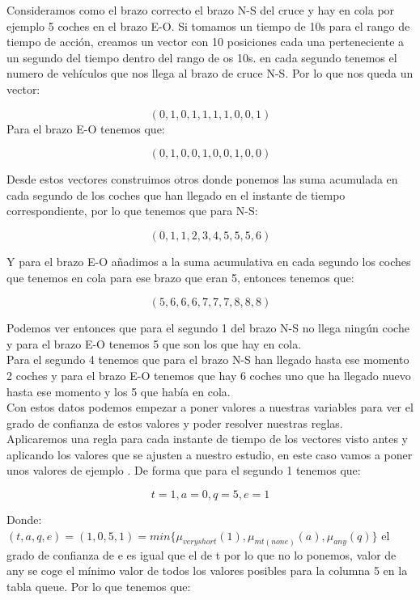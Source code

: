 Consideramos como el brazo correcto el brazo N-S del cruce y hay en cola por ejemplo 5 coches en el brazo E-O. Si tomamos un tiempo de 10s para el rango de tiempo de acción, creamos un vector con 10 posiciones cada una perteneciente a un segundo del tiempo dentro del rango de os 10s. en cada segundo tenemos el numero de vehículos que nos llega al brazo de cruce N-S. Por lo que nos queda un vector:

$$(0, 1, 0, 1, 1, 1, 1, 0, 0, 1)$$
Para el brazo E-O tenemos que:

$$(0, 1, 0, 0, 1, 0, 0, 1, 0, 0)$$

Desde estos vectores construimos otros donde ponemos las suma acumulada en cada segundo de los coches que han llegado en el instante de tiempo correspondiente, por lo que tenemos que para N-S:

$$(0, 1, 1, 2, 3, 4, 5, 5, 5, 6)$$

Y para el brazo E-O añadimos a la suma acumulativa en cada segundo los coches que tenemos en cola para ese brazo que eran 5, entonces tenemos que:

$$(5, 6, 6, 6, 7, 7, 7, 8, 8, 8)$$

Podemos ver entonces que para el segundo 1 del brazo N-S no llega ningún coche y para el brazo E-O tenemos 5 que son los que hay en cola.\\

Para el segundo 4 tenemos que para el brazo N-S han llegado hasta ese momento 2 coches y para el brazo E-O tenemos que hay 6 coches uno que ha llegado nuevo hasta ese momento y los 5 que había en cola.\\

Con estos datos podemos empezar a poner valores a nuestras variables para ver el grado de confianza de estos valores y poder resolver nuestras reglas.\\

Aplicaremos una regla para cada instante de tiempo de los vectores visto antes y aplicando los valores que se ajusten a nuestro estudio, en este caso vamos a poner unos valores de ejemplo . De forma que para el segundo 1 tenemos que:

$$t=1, a=0, q=5, e=1$$

Donde:
$(t,a,q,e)=(1,0,5,1)=min\{\mu_{very short}(1), \mu_{mt(none)}(a), \mu_{any}(q)\}$ el grado de confianza de e es igual que el de t por lo que no lo ponemos, valor de any se coge el mínimo valor de todos los valores posibles para la columna 5 en la tabla queue.
Por lo que tenemos que:


